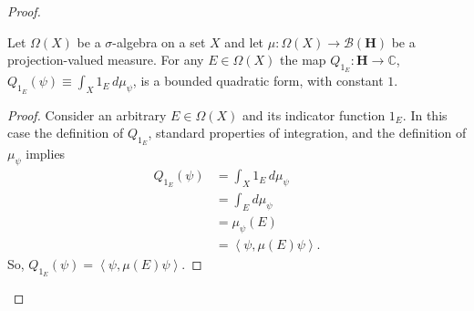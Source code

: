 \begin{proof}
\begin{proposition}
    \label{prpstn:Q-indicator-bounded-form}
    \leanok
    Let $\Omega(X)$ be a $\sigma$-algebra on a set $X$ and let $\mu : \Omega(X) \rightarrow \mathcal{B}(\mathbf{H})$ be a projection-valued measure. For any $E \in \Omega(X)$ the map $Q_{1_E} : \mathbf{H} \rightarrow \mathbb{C}$, $Q_{1_E}(\psi) \equiv \int_X 1_E \, d\mu_\psi$, is a bounded quadratic form, with constant $1$.
\end{proposition}
\begin{proof}
    \leanok
Consider an arbitrary $E \in \Omega(X)$ and its indicator function $1_E$. In this case the definition of $Q_{1_E}$, standard properties of integration, and the definition of $\mu_\psi$ implies
\begin{align}
    Q_{1_E}(\psi) &= \int_X 1_E \, d\mu_\psi \\
                  &= \int_E d\mu_\psi \\
                  &= \mu_\psi(E) \\
                  &= \left< \psi, \mu(E) \psi \right>.
\end{align}
So, $Q_{1_E}(\psi) = \left< \psi, \mu(E) \psi \right>$.


\end{proof}
\end{proof}
